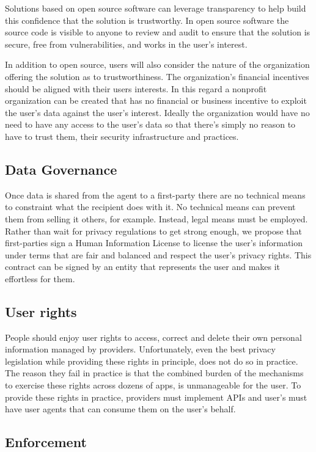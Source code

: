 \documentclass[11pt, oneside]{article}   	%
\begin{document}
Solutions based on open source software can leverage transparency to help build this confidence that the solution is trustworthy. In open source software the source code is visible to anyone to review and audit to ensure that the solution is secure, free from vulnerabilities, and works in the user's interest.

In addition to open source, users will also consider the nature of the organization offering the solution as to trustworthiness. The organization's financial incentives should be aligned with their users interests. In this regard a nonprofit organization can be created that has no financial or business incentive to exploit the user's data against the user's interest. Ideally the organization would have no need to have any access to the user's data so that there's simply no reason to have to trust them, their security infrastructure and practices.

\subsection{Data Governance}

Once data is shared from the agent to a first-party there are no technical means to constraint what the recipient does with it. No technical means can prevent them from selling it others, for example. Instead, legal means must be employed. Rather than wait for privacy regulations to get strong enough, we propose that first-parties sign a Human Information License to license the user's information under terms that are fair and balanced and respect the user's privacy rights. This contract can be signed by an entity that represents the user and makes it effortless for them.

\subsection{User rights}

People should enjoy user rights to access, correct and delete their own personal information managed by providers. Unfortunately, even the best privacy legislation while providing these rights in principle, does not do so in practice. The reason they fail in practice is that the combined burden of the mechanisms to exercise these rights across dozens of apps, is unmanageable for the user. To provide these rights in practice, providers must implement APIs and user's must have user agents that can consume them on the user's behalf.

\subsection{Enforcement}
\end{document}
